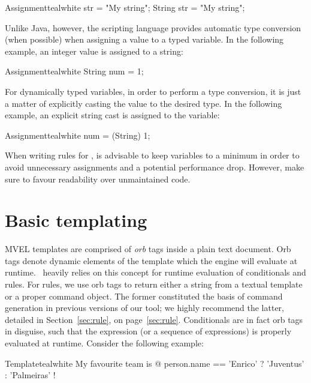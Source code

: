 \begin{codebox}{Assignment}{teal}{\icnote}{white}
str = "My string";
String str = "My string";
\end{codebox}

Unlike Java, however, the scripting language provides automatic type conversion (when possible) when assigning a value to a typed variable. In the following example, an integer value is assigned to a string:

\begin{codebox}{Assignment}{teal}{\icnote}{white}
String num = 1;
\end{codebox}

For dynamically typed variables, in order to perform a type conversion, it is just a matter of explicitly casting the value to the desired type. In the following example, an explicit string cast is assigned to the  variable:

\begin{codebox}{Assignment}{teal}{\icnote}{white}
num = (String) 1;
\end{codebox}

When writing rules for \arara, is advisable to keep variables to a minimum in order to avoid unnecessary assignments and a potential performance drop. However, make sure to favour readability over unmaintained code.

\section{Basic templating}
\label{sec:mvelbasictemplating}

MVEL templates are comprised of \emph{orb} tags inside a plain text document. Orb tags denote dynamic elements of the template which the engine will evaluate at runtime. \arara\ heavily relies on this concept for runtime evaluation of conditionals and rules. For rules, we use orb tags to return either a string from a textual template or a proper command object. The former constituted the basis of command generation in previous versions of our tool; we highly recommend the latter, detailed in Section~\ref{sec:rule}, on page~\ref{sec:rule}. Conditionals are in fact orb tags in disguise, such that the expression (or a sequence of expressions) is properly evaluated at runtime. Consider the following example:

\begin{codebox}{Template}{teal}{\icnote}{white}
My favourite team is @{ person.name == 'Enrico'
? 'Juventus' : 'Palmeiras' }!
\end{codebox}

